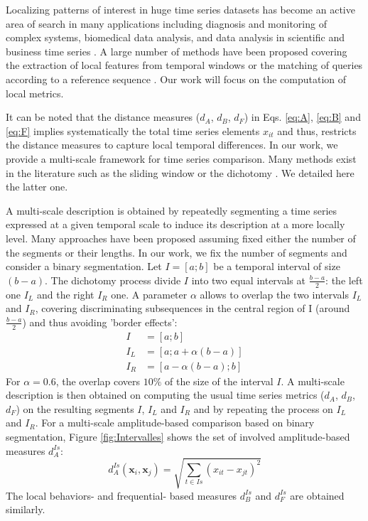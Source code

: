 Localizing patterns of interest in huge time series datasets has become an active area of search in many applications including diagnosis and monitoring of complex systems, biomedical data analysis, and data analysis in scientific and business time series . A large number of methods have been proposed covering the extraction of local features from temporal windows \cite{Berndt1994a} or the matching of queries according to a reference sequence \cite{Faloutsos1994}. Our work will focus on the computation of local metrics.

It can be noted that the distance measures ($d_A$, $d_B$, $d_F$) in Eqs. \ref{eq:A}, \ref{eq:B} and \ref{eq:F} implies systematically the total time series elements $x_{it}$ and thus, restricts the distance measures to capture local temporal differences. In our work, we provide a multi-scale framework for time series comparison. Many methods exist in the literature such as the sliding window or the dichotomy . We detailed here the latter one.


A multi-scale description is obtained by repeatedly segmenting a time series expressed at a given temporal scale to induce its description at a more locally level. Many approaches have been proposed assuming fixed either the number of the segments or their lengths. In our work, we fix the number of segments and consider a binary segmentation. Let $I=[a;b]$ be a temporal interval of size $(b-a)$. The dichotomy process divide $I$  into two equal intervals at $\frac{b-a}{2}$: the left one $I_L$ and the right $I_R$ one. A parameter $\alpha$ allows to overlap the two intervals $I_L$ and $I_R$, covering discriminating subsequences in the central region of I (around $\frac{b-a}{2}$) and thus avoiding 'border effects':
\begin{align}
	I &= [a;b] \\
	I_L &= [a;a+\alpha(b-a)] \\
	I_R &= [a-\alpha(b-a);b] 
\label{key}
\end{align}
\noindent For $\alpha = 0.6$, the overlap covers $10\%$ of the size of the interval $I$. A multi-scale description is then obtained on computing the usual time series metrics ($d_A$, $d_B$, $d_F$) on the resulting segments $I$, $I_L$ and $I_R$ and by repeating the process on $I_L$ and $I_R$. For a multi-scale amplitude-based comparison based on binary segmentation, Figure \ref{fig:Intervalles} shows the set of involved amplitude-based measures $d^{Is}_A$:
\begin{equation}	
d^{Is}_A(\textbf{x}_i,\textbf{x}_j) = \sqrt{\sum\limits_{t \in Is} (x_{it}-x_{jt})^2}
\label{eq:A}
\end{equation}
The local behaviors- and frequential- based measures $d^{Is}_B$ and $d^{Is}_F$ are obtained similarly.

